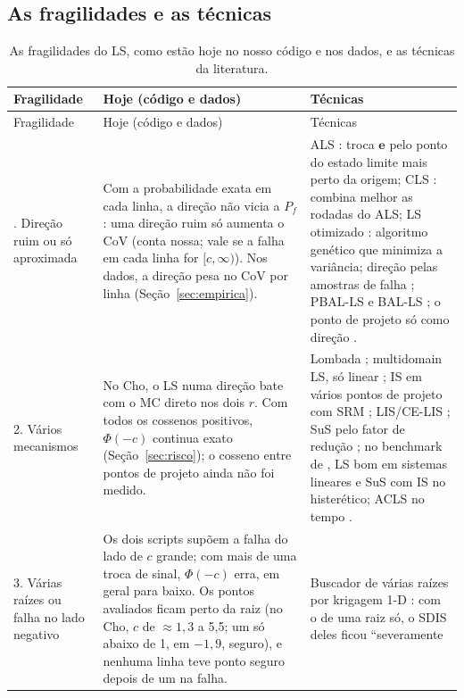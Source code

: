 \documentclass[11pt,a4paper]{article}
\begin{document}
\subsection{As fragilidades e as técnicas}\label{sec:fragil}
{\small\setlength{\tabcolsep}{4pt}
\begin{longtable}{L{2.3cm}L{6.6cm}L{6.8cm}}
\caption{As fragilidades do LS, como estão hoje no nosso código e nos dados, e as técnicas da literatura.}
\label{tab:fragil}\\
\toprule
Fragilidade & Hoje (código e dados) & Técnicas \\
\midrule\endfirsthead
\toprule Fragilidade & Hoje (código e dados) & Técnicas \\ \midrule\endhead
\bottomrule{}. Direção ruim ou só aproximada &
  Com a probabilidade exata em cada linha, a direção não vicia a $P_f$: uma direção ruim só aumenta o CoV (conta nossa;
  vale se a falha em cada linha for $[c, \infty)$). Nos dados, a direção pesa no CoV por linha
  (Seção~\ref{sec:empirica}). &
  ALS \citep{deangelis2015}: troca $\bm e$ pelo ponto do estado limite mais perto da origem; CLS
  \citep{papaioannou2021}: combina melhor as rodadas do ALS; LS otimizado \citep{zio2010}: algoritmo genético que
  minimiza a variância; direção pelas amostras de falha \citep{koutsourelakis2004}; PBAL-LS e BAL-LS
  \citep{dang2023pbal,dang2023bal}; o ponto de projeto só como direção \citep{valdebenito2010}. \\
2. Vários mecanismos &
  No Cho, o LS numa direção bate com o MC direto nos dois $r$. Com todos os cossenos positivos, $\Phi(-c)$ continua
  exato (Seção~\ref{sec:risco}); o cosseno entre pontos de projeto ainda não foi medido. &
  Lombada \citep{derkiureghian1998}; multidomain LS, só linear \citep{valdebenito2021}; IS em vários pontos de projeto
  com SRM \citep{zhao2021}; LIS/CE-LIS \citep{zhang2026}; SuS pelo fator de redução \citep{vandeneijnden2017}; no
  benchmark de \citet{pradlwarter2007}, LS bom em sistemas lineares e SuS com IS no histerético; ACLS no tempo
  \citep{yuan2024}. \\
3. Várias raízes ou falha no lado negativo &
  Os dois scripts supõem a falha do lado de $c$ grande; com mais de uma troca de sinal, $\Phi(-c)$ erra, em geral para
  baixo. Os pontos avaliados ficam perto da raiz (no Cho, $c$ de $\approx 1{,}3$ a 5,5; um só abaixo de 1, em
  $-1{,}9$, seguro), e nenhuma linha teve ponto seguro depois de um na falha. &
  Buscador de várias raízes por krigagem 1-D \citep{cheng2025}: com o de uma raiz só, o SDIS deles ficou ``severamente

\end{longtable}}
\end{document}
